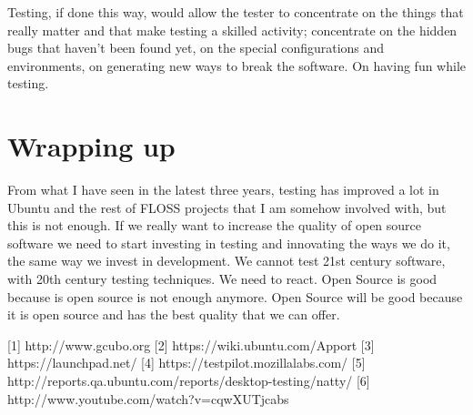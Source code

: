 Testing, if done this way, would allow the tester to concentrate on the things that really matter and that make testing a skilled activity; concentrate on the hidden bugs that haven't been found yet, on the special configurations and environments, on generating new ways to break the software. On having fun while testing.

\section*{Wrapping up}

From what I have seen in the latest three years, testing has improved a lot in Ubuntu and the rest of FLOSS projects that I am somehow involved with, but this is not enough. If we really want to increase the quality of open source software we need to start investing in testing and innovating the ways we do it, the same way we invest in development. We cannot test 21st century software, with 20th century testing techniques. We need to react. Open Source is good because is open source is not enough anymore. Open Source will be good because it is open source and has the best quality that we can offer.


[1] http://www.gcubo.org
[2] https://wiki.ubuntu.com/Apport
[3] https://launchpad.net/
[4] https://testpilot.mozillalabs.com/
[5] http://reports.qa.ubuntu.com/reports/desktop-testing/natty/
[6] http://www.youtube.com/watch?v=cqwXUTjcabs